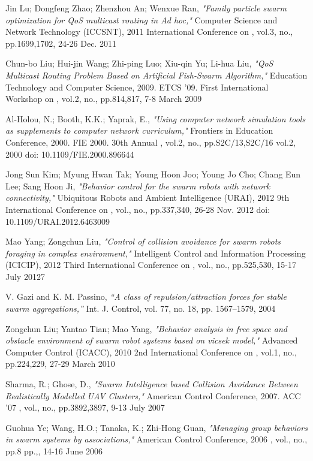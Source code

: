 \documentclass[journal]{IEEEtran}
\begin{document}
\begin{thebibliography}{1}
Jin Lu; Dongfeng Zhao; Zhenzhou An; Wenxue Ran, \emph{"Family particle swarm optimization for QoS multicast routing in Ad hoc,"} Computer Science and Network Technology (ICCSNT), 2011 International Conference on , vol.3, no., pp.1699,1702, 24-26 Dec. 2011

Chun-bo Liu; Hui-jin Wang; Zhi-ping Luo; Xiu-qin Yu; Li-hua Liu, \emph{"QoS Multicast Routing Problem Based on Artificial Fish-Swarm Algorithm,"} Education Technology and Computer Science, 2009. ETCS '09. First International Workshop on , vol.2, no., pp.814,817, 7-8 March 2009

Al-Holou, N.; Booth, K.K.; Yaprak, E., \emph{"Using computer network simulation tools as supplements to computer network curriculum,"} Frontiers in Education Conference, 2000. FIE 2000. 30th Annual , vol.2, no., pp.S2C/13,S2C/16 vol.2, 2000
doi: 10.1109/FIE.2000.896644

Jong Sun Kim; Myung Hwan Tak; Young Hoon Joo; Young Jo Cho; Chang Eun Lee; Sang Hoon Ji, \emph{"Behavior control for the swarm robots with network connectivity,"} Ubiquitous Robots and Ambient Intelligence (URAI), 2012 9th International Conference on , vol., no., pp.337,340, 26-28 Nov. 2012
doi: 10.1109/URAI.2012.6463009

Mao Yang; Zongchun Liu, \emph{"Control of collision avoidance for swarm robots foraging in complex environment,"} Intelligent Control and Information Processing (ICICIP), 2012 Third International Conference on , vol., no., pp.525,530, 15-17 July 20127

V. Gazi and K. M. Passino, \emph{“A class of repulsion/attraction forces for stable swarm aggregations,”} Int. J. Control, vol. 77, no. 18, pp.  1567–1579, 2004

Zongchun Liu; Yantao Tian; Mao Yang, \emph{"Behavior analysis in free space and obstacle environment of swarm robot systems based on vicsek model,"} Advanced Computer Control (ICACC), 2010 2nd International Conference on , vol.1, no., pp.224,229, 27-29 March 2010

Sharma, R.; Ghose, D., \emph{"Swarm Intelligence based Collision Avoidance Between Realistically Modelled UAV Clusters,"} American Control Conference, 2007. ACC '07 , vol., no., pp.3892,3897, 9-13 July 2007

Guohua Ye; Wang, H.O.; Tanaka, K.; Zhi-Hong Guan, \emph{"Managing group behaviors in swarm systems by associations,"} American Control Conference, 2006 , vol., no., pp.8 pp.,, 14-16 June 2006
\end{thebibliography}
\end{document}

